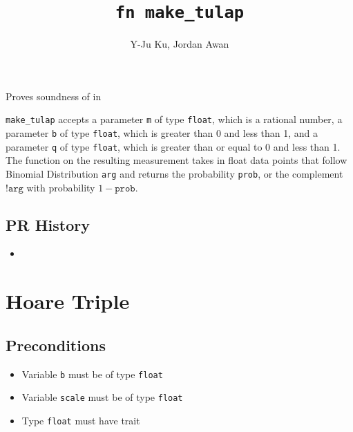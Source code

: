 \documentclass{article}
\title{\texttt{fn make\_tulap}}
\author{Y-Ju Ku, Jordan Awan}
\begin{document}
\maketitle

\contrib

Proves soundness of  in 

\texttt{make\_tulap} accepts a parameter \texttt{m} of type \texttt{float}, which is a rational number, a parameter \texttt{b} of type \texttt{float}, which is greater than 0 and less than 1, and a parameter \texttt{q} of type \texttt{float}, which is greater than or equal to 0 and less than 1.
The function on the resulting measurement takes in float data points that follow Binomial Distribution \texttt{arg} and returns the probability \texttt{prob}, or the complement $\texttt{!arg}$ with probability $1 - \texttt{prob}$.


\subsection*{PR History}
\begin{itemize}
    \item \vettingPR{}
\end{itemize}

\section{Hoare Triple}

\subsection*{Preconditions}
\begin{itemize}
    \item Variable \texttt{b} must be of type \texttt{float}
    \item Variable \texttt{scale} must be of type \texttt{float}
    \item Type \texttt{float} must have trait 
\end{itemize}
\end{document}
